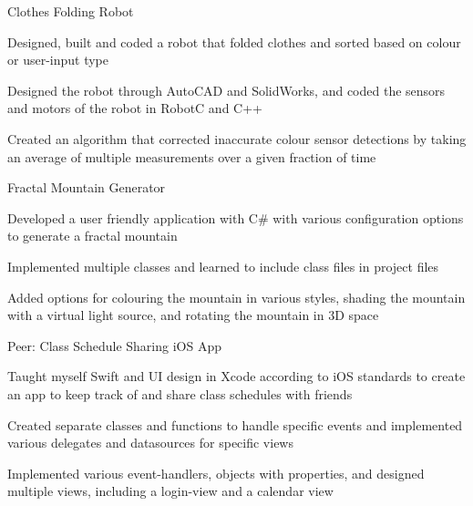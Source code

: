\begin{cventries}
  \cventry
    {Clothes Folding Robot}
    {}
    {}
    {
      \begin{cvitems}
        \item {Designed, built and coded a robot that folded clothes and sorted based on colour or user-input type}
        \item {Designed the robot through AutoCAD and SolidWorks, and coded the sensors and motors of the robot in RobotC and C++}
        \item {Created an algorithm that corrected inaccurate colour sensor detections by taking an average of multiple measurements over a given fraction of time}
      \end{cvitems}
    }
  \cventry
    {Fractal Mountain Generator}
    {}
    {}
    {
      \begin{cvitems}
        \item {Developed a user friendly application with C# with various configuration options to generate a fractal mountain}
        \item {Implemented multiple classes and learned to include class files in project files}
        \item {Added options for colouring the mountain in various styles, shading the mountain with a virtual light source, and rotating the mountain in 3D space}
      \end{cvitems}
    }
  \cventry
    {Peer: Class Schedule Sharing iOS App}
    {}
    {}
    {
      \begin{cvitems}
        \item {Taught myself Swift and UI design in Xcode according to iOS standards to create an app to keep track of and share class schedules with friends}
        \item {Created separate classes and functions to handle specific events and implemented various delegates and datasources for specific views}
        \item {Implemented various event-handlers, objects with properties, and designed multiple views, including a login-view and a calendar view}
      \end{cvitems}
    }
\end{cventries}
